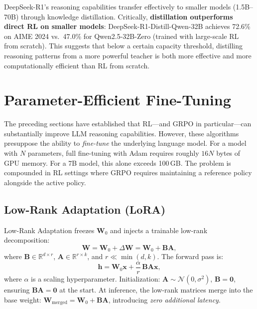 \documentclass[12pt,a4paper]{report}
\theoremstyle{definition}
\begin{document}
DeepSeek-R1's reasoning capabilities transfer effectively to smaller models (1.5B--70B) through knowledge distillation. Critically, \textbf{distillation outperforms direct RL on smaller models}: DeepSeek-R1-Distill-Qwen-32B achieves 72.6\% on AIME 2024 vs.\ 47.0\% for Qwen2.5-32B-Zero (trained with large-scale RL from scratch). This suggests that below a certain capacity threshold, distilling reasoning patterns from a more powerful teacher is both more effective and more computationally efficient than RL from scratch.


\section{Parameter-Efficient Fine-Tuning}
\label{sec:peft}

The preceding sections have established that RL---and GRPO in particular---can substantially improve LLM reasoning capabilities. However, these algorithms presuppose the ability to \emph{fine-tune} the underlying language model. For a model with $N$ parameters, full fine-tuning with Adam requires roughly $16N$ bytes of GPU memory. For a 7B model, this alone exceeds 100\,GB. The problem is compounded in RL settings where GRPO requires maintaining a reference policy alongside the active policy.

\subsection{Low-Rank Adaptation (LoRA)}
\label{sec:lora}

Low-Rank Adaptation \citep{hu2021lora} freezes $\mathbf{W}_0$ and injects a trainable low-rank decomposition:
\begin{equation}
  \label{eq:lora-weight}
  \mathbf{W} = \mathbf{W}_0 + \Delta\mathbf{W}
             = \mathbf{W}_0 + \mathbf{B}\mathbf{A},
\end{equation}
where $\mathbf{B} \in \mathbb{R}^{d \times r}$, $\mathbf{A} \in \mathbb{R}^{r \times k}$, and $r \ll \min(d, k)$. The forward pass is:
\begin{equation}
  \mathbf{h} = \mathbf{W}_0 \mathbf{x}
               + \frac{\alpha}{r}\,\mathbf{B}\mathbf{A}\mathbf{x},
\end{equation}
where $\alpha$ is a scaling hyperparameter. Initialization: $\mathbf{A} \sim \mathcal{N}(0, \sigma^2)$, $\mathbf{B} = \mathbf{0}$, ensuring $\mathbf{B}\mathbf{A} = \mathbf{0}$ at the start. At inference, the low-rank matrices merge into the base weight: $\mathbf{W}_{\text{merged}} = \mathbf{W}_0 + \mathbf{B}\mathbf{A}$, introducing \emph{zero additional latency}.
\end{document}
